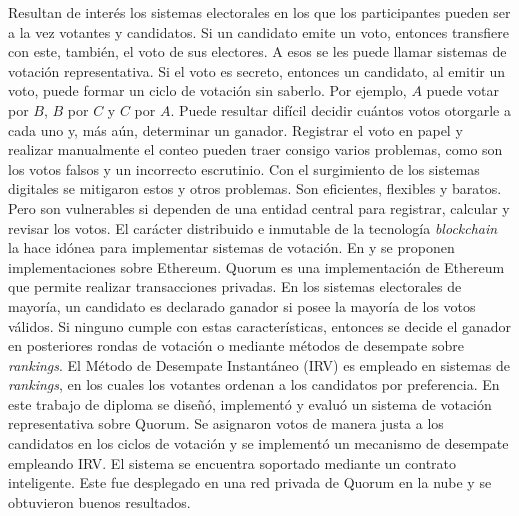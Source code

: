 \begin{resumen}
	Resultan de inter\'es los sistemas electorales en los que los participantes pueden ser a la vez votantes y candidatos. Si un candidato emite un voto, entonces transfiere con este, tambi\'en, el voto de sus electores. A esos se les puede llamar sistemas de votaci\'on representativa. Si el voto es secreto, entonces un candidato, al emitir un voto, puede formar un ciclo de votaci\'on sin saberlo. Por ejemplo, $A$ puede votar por $B$, $B$ por $C$ y $C$ por $A$. Puede resultar dif\'icil decidir cu\'antos votos otorgarle a cada uno y, m\'as a\'un, determinar un ganador.  Registrar el voto en papel y realizar manualmente el conteo pueden traer consigo varios problemas, como son los votos falsos y un incorrecto escrutinio. Con el surgimiento de los sistemas digitales se mitigaron estos y otros problemas.  Son eficientes, flexibles y baratos. Pero son vulnerables si dependen de una entidad central para registrar, calcular y revisar los votos. El car\'acter distribuido e inmutable de la tecnolog\'ia \textit{blockchain} la hace id\'onea para implementar sistemas de votaci\'on. En \cite{ovn} y \cite{borda_count} se proponen implementaciones sobre Ethereum. Quorum es una implementaci\'on de Ethereum que permite realizar transacciones privadas.  En los sistemas electorales de mayor\'ia, un candidato es declarado ganador si posee la mayor\'ia de los votos v\'alidos. Si ninguno cumple con estas caracter\'isticas, entonces se decide el ganador en posteriores rondas de votaci\'on o mediante m\'etodos de desempate sobre \textit{rankings}. El M\'etodo de Desempate Instant\'aneo (IRV) es empleado en sistemas de \textit{rankings}, en los cuales los votantes ordenan a los candidatos por preferencia. En este trabajo de diploma se dise\~n\'o, implement\'o y evalu\'o un sistema de votaci\'on  representativa sobre Quorum.  Se asignaron votos de manera justa a los candidatos en los ciclos de votaci\'on y se implement\'o un mecanismo de desempate empleando IRV. El sistema se encuentra soportado mediante un contrato inteligente. Este fue desplegado en una red privada de Quorum en la nube y se obtuvieron buenos resultados.

\end{resumen}

